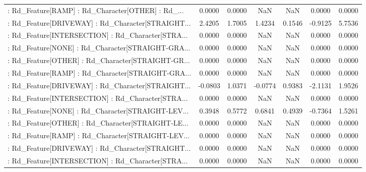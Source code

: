 \begin{longtable}{p{4cm}cccccc}
 : Rd\_Feature[RAMP] : Rd\_Character[OTHER] : Rd\_... &            0.0000 &            0.0000 &     NaN &          NaN &             0.0000 &            0.0000 \\
 : Rd\_Feature[DRIVEWAY] : Rd\_Character[STRAIGHT... &            2.4205 &            1.7005 &  1.4234 &       0.1546 &            -0.9125 &            5.7536 \\
 : Rd\_Feature[INTERSECTION] : Rd\_Character[STRA... &            0.0000 &            0.0000 &     NaN &          NaN &             0.0000 &            0.0000 \\
 : Rd\_Feature[NONE] : Rd\_Character[STRAIGHT-GRA... &            0.0000 &            0.0000 &     NaN &          NaN &             0.0000 &            0.0000 \\
 : Rd\_Feature[OTHER] : Rd\_Character[STRAIGHT-GR... &            0.0000 &            0.0000 &     NaN &          NaN &             0.0000 &            0.0000 \\
 : Rd\_Feature[RAMP] : Rd\_Character[STRAIGHT-GRA... &            0.0000 &            0.0000 &     NaN &          NaN &             0.0000 &            0.0000 \\
 : Rd\_Feature[DRIVEWAY] : Rd\_Character[STRAIGHT... &           -0.0803 &            1.0371 & -0.0774 &       0.9383 &            -2.1131 &            1.9526 \\
 : Rd\_Feature[INTERSECTION] : Rd\_Character[STRA... &            0.0000 &            0.0000 &     NaN &          NaN &             0.0000 &            0.0000 \\
 : Rd\_Feature[NONE] : Rd\_Character[STRAIGHT-LEV... &            0.3948 &            0.5772 &  0.6841 &       0.4939 &            -0.7364 &            1.5261 \\
 : Rd\_Feature[OTHER] : Rd\_Character[STRAIGHT-LE... &            0.0000 &            0.0000 &     NaN &          NaN &             0.0000 &            0.0000 \\
 : Rd\_Feature[RAMP] : Rd\_Character[STRAIGHT-LEV... &            0.0000 &            0.0000 &     NaN &          NaN &             0.0000 &            0.0000 \\
 : Rd\_Feature[DRIVEWAY] : Rd\_Character[STRAIGHT... &            0.0000 &            0.0000 &     NaN &          NaN &             0.0000 &            0.0000 \\
 : Rd\_Feature[INTERSECTION] : Rd\_Character[STRA... &            0.0000 &            0.0000 &     NaN &          NaN &             0.0000 &            0.0000 \\

\end{longtable}
